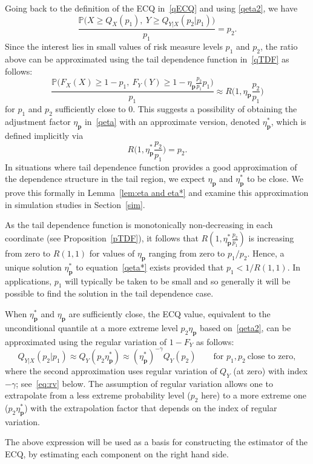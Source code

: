 \documentclass[11pt,letterpaper]{article}
\def\bql{\begin{equation}\label}
\def\eql{\end{equation}\noindent}
\def\g{\gamma}
\def\h{\eta}
\def\pb{{\mathbf p}}
\def\pbb{{\mathbb P}}
\numberwithin{equation}{section}
\begin{document}
Going back to the definition of the ECQ in~\eqref{qECQ} and using \eqref{qeta2}, we have
$$\dfrac{\pbb\bigl(X\ge Q_X(p_1),\ Y\ge Q_{Y|X}(p_2|p_1) \bigr)}{p_1} = p_2. $$
Since the interest lies in small values of risk measure levels $p_1$ and $p_2$, the ratio above can be approximated using the tail dependence function in~\eqref{qTDF} as follows:
$$\dfrac{\pbb\Big(F_X(X)\ge 1- p_1,\ F_Y(Y)\ge 1-\h_\pb\frac{p_2}{p_1}p_1\Big)}{p_1}\approx R\Big(1,\h_\pb\frac{p_2}{p_1}\Big)$$
for $p_1$ and $p_2$ sufficiently close to 0. This suggests a possibility of obtaining the adjustment factor $\h_\pb$ in~\eqref{qeta} with an approximate version, denoted $\h_\pb^*$, which is defined implicitly via
\bql{qeta*} R\Big(1,\h_\pb^*\frac{p_2}{p_1}\Big) = p_2.\eql
In situations where tail dependence function provides a good approximation of the dependence structure in the tail region, we expect $\h_\pb$ and $\h_\pb^*$ to be close. We prove this formally in Lemma~\ref{lem:eta and eta*} and examine this approximation in simulation studies in Section~\ref{sim}. 

As the tail dependence function is monotonically non-decreasing in each coordinate (see Proposition~\ref{pTDF}), it follows that 
$R(1,\h_\pb^*\frac{p_2}{p_1})$ is increasing from zero to $R(1,1)$ for values of $\h_\pb$ ranging from zero to $p_1/p_2$. Hence, a unique solution $\h_\pb^*$ to equation~\eqref{qeta*} exists provided that $p_1<1/R(1,1)$. In applications, $p_1$ will typically be taken to be small and so generally it will be possible to find the solution in the tail dependence case.  

When $\h_\pb^*$ and $\h_\pb$ are sufficiently close, the ECQ value, equivalent to the unconditional quantile at a more extreme level $p_2\h_\pb$ based on~\eqref{qeta2}, can be approximated using the regular variation of $1-F_Y$ as follows:
\bql{qRVa}
Q_{Y|X}(p_2|p_1) \approx Q_Y(p_2\h_\pb^*)\approx (\h_\pb^*)^{-\g}Q_Y(p_2)\qquad \text{for } p_1,p_2\ \text{close to zero},
\eql
where the second approximation uses regular variation of $Q_Y$ (at zero) with index $-\g$; see~\eqref{eq:rv} below. The assumption of regular variation allows one to extrapolate from a less extreme probability level ($p_2$ here) to a more extreme one ($p_2\h_\pb^*$) with the extrapolation factor that depends on the index of regular variation.

The above expression will be used as a basis for constructing the estimator of the ECQ, by estimating each component on the right hand side. 
\end{document}
